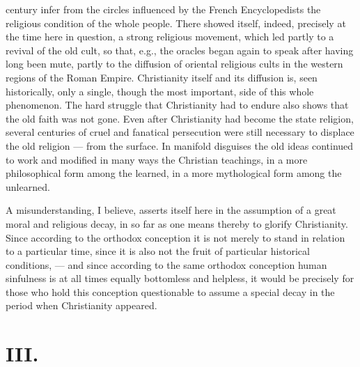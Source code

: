 \documentclass[12pt,a4paper,openany]{book}
\newcommand{\opage}[1]{\marginnote{\footnotesize\textit{[#1]}}}
\begin{document}
century infer from the circles influenced by the French Encyclopedists
the religious condition of the whole people. There
showed itself, indeed, precisely at the time here in question, a
strong religious movement, which led partly to a revival of
the old cult, so that, e.g., the oracles began again
to speak after having long been mute, partly to the diffusion
of oriental religious cults in the western regions of the Roman Empire.
Christianity itself and its diffusion is, seen historically,
only a single, though the most important, side of this whole
phenomenon. The hard struggle that Christianity had to endure
also shows that the old faith was not gone. Even after
Christianity had become the state religion, several
centuries of cruel and fanatical persecution were still necessary
to displace the old religion --- from the surface. In
\opage{164}manifold disguises the old ideas continued
to work and modified in many ways the Christian
teachings, in a more philosophical form among the learned, in a more
mythological form among the unlearned.

A misunderstanding, I believe, asserts itself here in
the assumption of a great moral and religious decay, in so far as one
means thereby to glorify Christianity. Since
according to the orthodox conception it is not merely to stand in
relation to a particular time, since it is also not the fruit of
particular historical conditions, --- and since according to the same
orthodox conception human sinfulness is at all times
equally bottomless and helpless, it would be precisely for
those who hold this conception questionable to assume a
special decay in the period when Christianity appeared.

\section*{III.}
\end{document}
